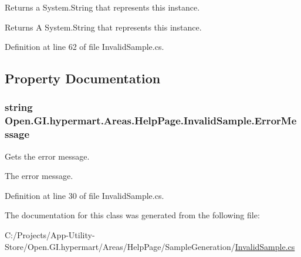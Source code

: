 Returns a System.\+String that represents this instance. 

\begin{DoxyReturn}{Returns}
A System.\+String that represents this instance. 
\end{DoxyReturn}


Definition at line 62 of file Invalid\+Sample.\+cs.



\subsection{Property Documentation}
\hypertarget{class_open_1_1_g_i_1_1hypermart_1_1_areas_1_1_help_page_1_1_invalid_sample_a89f95b69edc57c57963b214d0bc844af}{}
\subsubsection[{Error\+Message}]{\setlength{\rightskip}{0pt plus 5cm}string Open.\+G\+I.\+hypermart.\+Areas.\+Help\+Page.\+Invalid\+Sample.\+Error\+Message\hspace{0.3cm}{\ttfamily [get]}}\label{class_open_1_1_g_i_1_1hypermart_1_1_areas_1_1_help_page_1_1_invalid_sample_a89f95b69edc57c57963b214d0bc844af}


Gets the error message. 

The error message. 

Definition at line 30 of file Invalid\+Sample.\+cs.



The documentation for this class was generated from the following file\+:\begin{DoxyCompactItemize}
\item 
C\+:/\+Projects/\+App-\/\+Utility-\/\+Store/\+Open.\+G\+I.\+hypermart/\+Areas/\+Help\+Page/\+Sample\+Generation/\hyperlink{_invalid_sample_8cs}{Invalid\+Sample.\+cs}\end{DoxyCompactItemize}
